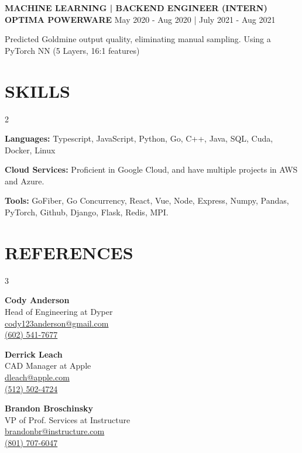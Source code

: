 \documentclass[a4paper,11pt]{article}
\newcommand{\bub}[1]{{\color{color} \MakeUppercase{\textbf{#1}}}}
\newcommand{\experience}[4]{
    \bub{#1} \\
    \textbf{#2} \hfill #3
    \begin{iitemize}
        #4
    \end{iitemize}
}
\newcommand{\reference}[4]{
    \begin{minipage}[t]{\linewidth}
        \textbf{#1} \\
        #2 \\
        \href{mailto:#3}{\color{black}#3} \\
        \href{tel:#4}{\color{black}#4}
    \end{minipage}
}
\begin{document}
\experience{Machine Learning | Backend Engineer (Intern)}{OPTIMA POWERWARE}{May 2020 - Aug 2020 | July 2021 - Aug 2021}{
    \item Predicted Goldmine output quality, eliminating manual sampling. Using a PyTorch NN (5 Layers, 16:1 features)
}

\section{SKILLS}

\begin{multicols}{2}
    \begin{iitemize}
        \item \textbf{Languages: } Typescript, JavaScript, Python, Go, C++, Java, SQL, Cuda, Docker, Linux
        \item \textbf{Cloud Services: } Proficient in Google Cloud, and have multiple projects in AWS and Azure.
        \item \textbf{Tools: } GoFiber, Go Concurrency, React, Vue, Node, Express, Numpy, Pandas, PyTorch, Github, Django, Flask, Redis, MPI.
    \end{iitemize}
\end{multicols}

\section{REFERENCES}

\begin{multicols}{3}
    \reference{Cody Anderson}{Head of Engineering at Dyper}{cody123anderson@gmail.com}{(602) 541-7677}
    \reference{Derrick Leach}{CAD Manager at Apple}{dleach@apple.com}{(512) 502-4724}
    \reference{Brandon Broschinsky}{VP of Prof. Services at Instructure}{brandonbr@instructure.com}{(801) 707-6047}
\end{multicols}

\end{document}

